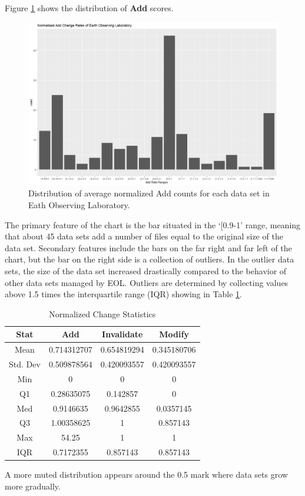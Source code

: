 Figure \ref{EOL_Adds} shows the distribution of \textbf{Add} scores.
\begin{figure}%
	\centering
	\includegraphics[scale=.43]{figures/Eol_Adds.png}
	\caption{Distribution of average normalized Add counts for each data set in Eath Observing Laboratory.}
	\label{EOL_Adds}
\end{figure}
The primary feature of the chart is the bar situated in the `[0.9-1' range, meaning that about 45 data sets add a number of files equal to the original size of the data set.
Secondary features include the bars on the far right and far left of the chart, but the bar on the right side is a collection of outliers.
In the outlier data sets, the size of the data set increased drastically compared to the behavior of other data sets managed by EOL.
Outliers are determined by collecting values above 1.5 times the interquartile range (IQR) showing in Table \ref{table:EOL_Change}.
\begin{table}
	\caption{Normalized Change Statistics}
	\label{table:EOL_Change}
	\centering
	\begin{tabular}{|c|c|c|c|}
		\hline
		Stat&	Add&	Invalidate&	Modify\\ \hline
		Mean&	0.714312707&	0.654819294&	0.345180706\\
		Std. Dev&	0.509878564&	0.420093557&	0.420093557\\
		Min&	0&	0&	0\\
		Q1&	0.28635075&	0.142857&	0\\
		Med&	0.9146635&	0.9642855&	0.0357145\\
		Q3&	1.00358625&	1&	0.857143\\
		Max&	54.25&	1&	1\\
		IQR&	0.7172355&	0.857143&	0.857143\\
		\hline
	\end{tabular}
\end{table}
A more muted distribution appears around the 0.5 mark where data sets grow more gradually.

